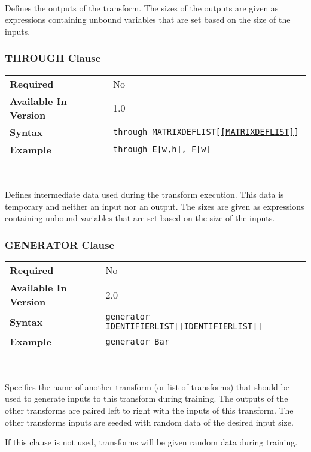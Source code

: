 \documentclass[11pt]{article}
\begin{document}
~

\noindent Defines the outputs of the transform.  The sizes of the outputs
are given as expressions containing unbound variables that are set based on the size
of the inputs.

\subsubsection{THROUGH Clause}

\begin{tabular}{| l | l |}
\hline
\bf Required & No                          \\
\bf Available In Version & 1.0             \\
\bf Syntax & \tt through MATRIXDEFLIST[\ref{MATRIXDEFLIST}]     \\
\bf Example & \tt through E[w,h], F[w]     \\
\hline
\end{tabular}

~

\noindent Defines intermediate data used during the transform execution. This
data is temporary and neither an input nor an output.  The sizes are given
as expressions containing unbound variables that are set based on the size
of the inputs.

\subsubsection{GENERATOR Clause}

\begin{tabular}{| l | l |}
\hline
\bf Required & No \\
\bf Available In Version & 2.0            \\
\bf Syntax & \tt generator IDENTIFIERLIST[\ref{IDENTIFIERLIST}]\\
\bf Example & \tt generator Bar\\
\hline
\end{tabular}

~

\noindent Specifies the name of another transform (or list of transforms)
that should be used to generate inputs to this transform during training.
The outputs of the other transforms are paired left to right with the inputs
of this transform.  The other transforms inputs are seeded with random data
of the desired input size.

If this clause is not used, transforms will be given random data during
training.
\end{document}
